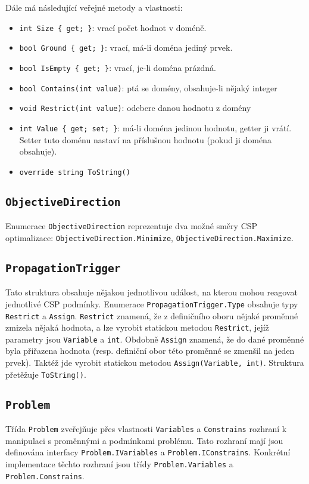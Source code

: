 \documentclass[a4paper]{article}
\begin{document}
Dále má následující veřejné metody a vlastnosti:
\begin{itemize}
\item
	\texttt{int Size \{ get; \}}: vrací počet hodnot v doméně.
\item	\texttt{bool Ground \{ get; \}}: vrací, má-li doména jediný prvek.
\item	\texttt{bool IsEmpty \{ get; \}}: vrací, je-li doména prázdná.
\item	\texttt{bool Contains(int value)}: ptá se domény, obsahuje-li nějaký
	integer
\item	\texttt{void Restrict(int value)}: odebere danou hodnotu z domény
\item	\texttt{int Value \{ get; set; \}}: má-li doména jedinou hodnotu,
	getter ji vrátí. Setter tuto doménu nastaví na příslušnou hodnotu (pokud
	ji doména obsahuje).
\item	\texttt{override string ToString()}
\end{itemize}

\subsection{\texttt{ObjectiveDirection}}
Enumerace \texttt{ObjectiveDirection} reprezentuje dva možné směry CSP
optimalizace: \texttt{ObjectiveDirection.Minimize},
\texttt{ObjectiveDirection.Maximize}.

\subsection{\texttt{PropagationTrigger}}
Tato struktura obsahuje nějakou jednotlivou událost, na kterou mohou reagovat
jednotlivé CSP podmínky. Enumerace \texttt{PropagationTrigger.Type} obsahuje
typy \texttt{Restrict} a \texttt{Assign}. \texttt{Restrict} znamená, že
z definičního oboru nějaké proměnné zmizela nějaká hodnota, a lze vyrobit
statickou metodou \texttt{Restrict}, jejíž parametry jsou \texttt{Variable} a
\texttt{int}. Obdobně \texttt{Assign}
znamená, že do dané proměnné byla přiřazena hodnota (resp. definiční obor této
proměnné se zmenšil na jeden prvek). Taktéž jde vyrobit statickou metodou
\texttt{Assign(Variable, int)}. Struktura přetěžuje \texttt{ToString()}.

\subsection{\texttt{Problem}}
Třída \texttt{Problem} zveřejňuje přes vlastnosti \texttt{Variables} a
\texttt{Constrains} rozhraní k manipulaci s proměnnými a
podmínkami problému. Tato rozhraní mají jsou definována interfacy
\texttt{Problem.IVariables} a \texttt{Problem.IConstrains}. Konkrétní
implementace těchto rozhraní jsou třídy \texttt{Problem.Variables} a
\texttt{Problem.Constrains}.
\end{document}
